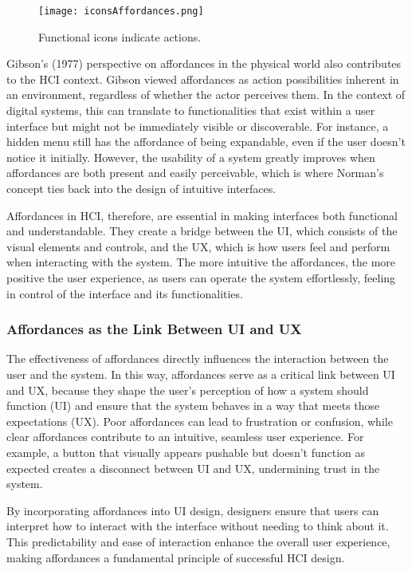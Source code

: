 \begin{figure}[h]
    \centering
    \texttt{[image: iconsAffordances.png]}
    \caption{Functional icons indicate actions.}
    \vspace{0.1cm}
    \label{fig:affordances}
\end{figure}

Gibson’s (1977) \cite{gibson1977theory} perspective on affordances in the physical world also contributes to the HCI context.
Gibson viewed affordances as action possibilities inherent in an environment, regardless of whether the actor perceives them.
In the context of digital systems, this can translate to functionalities that exist within a user interface but might not be immediately visible or discoverable.
For instance, a hidden menu still has the affordance of being expandable, even if the user doesn't notice it initially.
However, the usability of a system greatly improves when affordances are both present and easily perceivable, which is where Norman’s concept ties back into the design of intuitive interfaces.

Affordances in HCI, therefore, are essential in making interfaces both functional and understandable.
They create a bridge between the UI, which consists of the visual elements and controls, and the UX, which is how users feel and perform when interacting with the system.
The more intuitive the affordances, the more positive the user experience, as users can operate the system effortlessly, feeling in control of the interface and its functionalities.

\subsubsection{ Affordances as the Link Between UI and UX}

The effectiveness of affordances directly influences the interaction between the user and the system.
In this way, affordances serve as a critical link between UI and UX, because they shape the user’s perception of how a system should function (UI) and ensure that the system behaves in a way that meets those expectations (UX).
 Poor affordances can lead to frustration or confusion, while clear affordances contribute to an intuitive, seamless user experience.
 For example, a button that visually appears pushable but doesn’t function as expected creates a disconnect between UI and UX, undermining trust in the system.

By incorporating affordances into UI design, designers ensure that users can interpret how to interact with the interface without needing to think about it.
 This predictability and ease of interaction enhance the overall user experience, making affordances a fundamental principle of successful HCI design.

